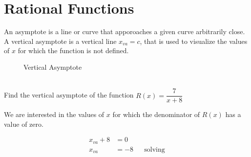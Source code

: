 
\section{Rational Functions}\label{Rational Functions}

\begin{definition}[Asympote]

An asymptote is a line or curve that apporoaches a given curve arbitrarily close.\cite{mathworld:asymptote} \\

A vertical asymptote is a vertical line $x_{va}=c$, that is used to visualize the values of $x$ for which the function is not defined. 

\end{definition}

\begin{figure}[ht]
\begin{center}
	
\end{center}
\caption{Vertical Asymptote}
\label{figure:rectangularhyperbola}
\end{figure}

\begin{example}[id:20141111-190212] \label{20141111-190212} \hfill \\

Find the vertical asymptote of the function $R(x)=\dfrac{7}{x+8}$

\soln

\solnsteps

We are interested in the values of $x$ for which the denominator of $R(x)$ has a value of zero.

\begin{align*}
x_{va}+8 &= 0 \\
x_{va} &=-8  &&\text{solving} 
\end{align*}

\begin{center}
	
\end{center}
\end{example}

